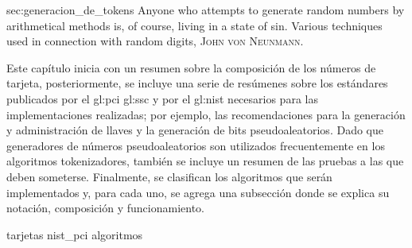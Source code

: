 %
%
%

{sec:generacion_de_tokens}
{
  \epigrafe
  {%
    Anyone who attempts to generate random numbers by arithmetical methods is,
    of course, living in a state of sin.%
  }
  {%
    Various techniques used in connection with random digits,
    \textsc{John von Neunmann}.%
  }
}

\noindent
Este capítulo inicia con un resumen sobre la composición de los números de
tarjeta, posteriormente, se incluye una serie de resúmenes sobre los estándares
publicados por el \gls{gl:pci} \gls{gl:ssc} y por el \gls{gl:nist} necesarios
para las implementaciones realizadas; por ejemplo, las recomendaciones para la
generación y administración de llaves y la generación de bits pseudoaleatorios.
Dado que generadores de números pseudoaleatorios son utilizados frecuentemente
en los algoritmos tokenizadores, también se incluye un resumen de las pruebas a
las que deben someterse. Finalmente, se clasifican los algoritmos que serán
implementados y, para cada uno, se agrega una subsección donde se explica su
notación, composición y funcionamiento.

{tarjetas}
{nist_pci}
{algoritmos}
